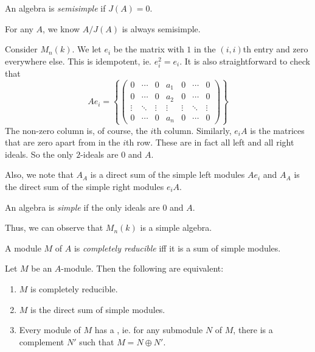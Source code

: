 \documentclass[a4paper]{article}
\begin{document}
\begin{defi}
  An algebra is \emph{semisimple} if $J(A) = 0$.
\end{defi}

\begin{eg}
  For any $A$, we know $A/J(A)$ is always semisimple.
\end{eg}

\begin{eg}
  Consider $M_n(k)$. We let $e_i$ be the matrix with $1$ in the $(i, i)$th entry and zero everywhere else. This is idempotent, ie. $e_i^2 = e_i$. It is also straightforward to check that
  \[
    A e_i =
    \left\{
      \begin{pmatrix}
        0 & \cdots & 0 & a_1 & 0 & \cdots & 0\\
        0 & \cdots & 0 & a_2 & 0 & \cdots & 0\\
        \vdots & \ddots & \vdots & \vdots & \vdots & \ddots & \vdots\\
        0 & \cdots & 0 & a_n & 0 & \cdots & 0
      \end{pmatrix}
    \right\}
  \]
  The non-zero column is, of course, the $i$th column. Similarly, $e_i A$ is the matrices that are zero apart from in the $i$th row. These are in fact all left and all right ideals. So the only $2$-ideals are $0$ and $A$.

  Also, we note that $A_A$ is a direct sum of the simple left modules $A e_i$ and $A_A$ is the direct sum of the simple right modules $e_i A$.
\end{eg}

\begin{defi}
  An algebra is \emph{simple} if the only ideals are $0$ and $A$.
\end{defi}
Thus, we can observe that $M_n(k)$ is a simple algebra.

\begin{defi}
  A module $M$ of $A$ is \emph{completely reducible} iff it is a sum of simple modules.
\end{defi}

\begin{prop}
  Let $M$ be an $A$-module. Then the following are equivalent:
  \begin{enumerate}
    \item $M$ is completely reducible.
    \item $M$ is the direct sum of simple modules.
    \item Every module of $M$ has a , ie. for any submodule $N$ of $M$, there is a complement $N'$ such that $M = N \oplus N'$.
  \end{enumerate}
\end{prop}
\end{document}
